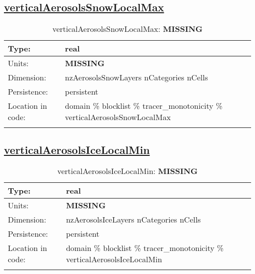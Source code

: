 \subsection[verticalAerosolsSnowLocalMax]{\hyperref[sec:var_tab_tracer_monotonicity]{verticalAerosolsSnowLocalMax}}
\label{subsec:var_sec_tracer_monotonicity_verticalAerosolsSnowLocalMax}
\begin{center}
\begin{longtable}{| p{2.0in} | p{4.0in} |}
        \hline 
        Type: & real \\
        \hline 
        Units: & {\bf \color{red} MISSING} \\
        \hline 
        Dimension: & nzAerosolsSnowLayers nCategories nCells \\
        \hline 
        Persistence: & persistent \\
        \hline 
         Location in code: & domain \% blocklist \% tracer\_monotonicity \% verticalAerosolsSnowLocalMax \\
         \hline 
    \caption{verticalAerosolsSnowLocalMax: {\bf \color{red} MISSING}}
\end{longtable}
\end{center}
\subsection[verticalAerosolsIceLocalMin]{\hyperref[sec:var_tab_tracer_monotonicity]{verticalAerosolsIceLocalMin}}
\label{subsec:var_sec_tracer_monotonicity_verticalAerosolsIceLocalMin}
\begin{center}
\begin{longtable}{| p{2.0in} | p{4.0in} |}
        \hline 
        Type: & real \\
        \hline 
        Units: & {\bf \color{red} MISSING} \\
        \hline 
        Dimension: & nzAerosolsIceLayers nCategories nCells \\
        \hline 
        Persistence: & persistent \\
        \hline 
         Location in code: & domain \% blocklist \% tracer\_monotonicity \% verticalAerosolsIceLocalMin \\
         \hline 
    \caption{verticalAerosolsIceLocalMin: {\bf \color{red} MISSING}}
\end{longtable}
\end{center}
